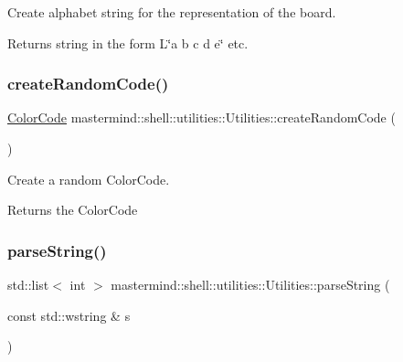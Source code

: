 Create alphabet string for the representation of the board. 

\begin{DoxyReturn}{Returns}
string in the form L\char`\"{}a b c d e\char`\"{} etc. 
\end{DoxyReturn}
\hypertarget{classmastermind_1_1shell_1_1utilities_1_1_utilities_ae384c27ca0a2b6866d9769b60ebb011f}{}\label{classmastermind_1_1shell_1_1utilities_1_1_utilities_ae384c27ca0a2b6866d9769b60ebb011f} 
\subsubsection{\texorpdfstring{create\+Random\+Code()}{createRandomCode()}}
{\footnotesize\ttfamily \hyperlink{classmastermind_1_1logic_1_1_color_code}{Color\+Code} mastermind\+::shell\+::utilities\+::\+Utilities\+::create\+Random\+Code (\begin{DoxyParamCaption}{ }\end{DoxyParamCaption})\hspace{0.3cm}{\ttfamily [static]}}



Create a random Color\+Code. 

\begin{DoxyReturn}{Returns}
the Color\+Code 
\end{DoxyReturn}
\hypertarget{classmastermind_1_1shell_1_1utilities_1_1_utilities_a42b5ee02b8c69c290ab27e9f76a8dbb9}{}\label{classmastermind_1_1shell_1_1utilities_1_1_utilities_a42b5ee02b8c69c290ab27e9f76a8dbb9} 
\subsubsection{\texorpdfstring{parse\+String()}{parseString()}}
{\footnotesize\ttfamily std\+::list$<$ int $>$ mastermind\+::shell\+::utilities\+::\+Utilities\+::parse\+String (\begin{DoxyParamCaption}\item[{const std\+::wstring \&}]{s }\end{DoxyParamCaption})\hspace{0.3cm}{\ttfamily [static]}}



